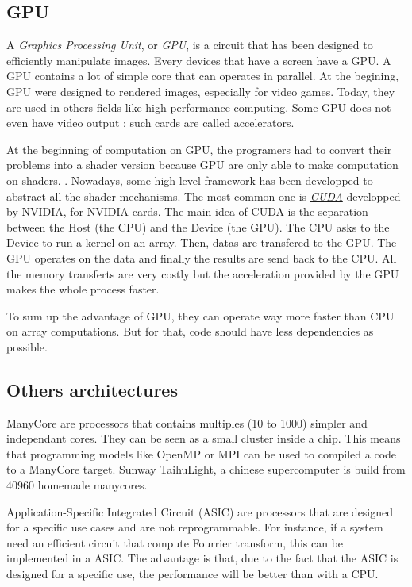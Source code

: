 \subsection{GPU}
A \emph{Graphics Processing Unit}, or \emph{GPU}, is a circuit that has been designed to efficiently manipulate images. Every devices that have a screen have a GPU. A GPU contains a lot of simple core that can operates in parallel. At the begining, GPU were designed to rendered images, especially for video games. Today, they are used in others fields like high performance computing. Some GPU does not even have video output : such cards are called accelerators.

At the beginning of computation on GPU, the programers had to convert their problems into a shader version because GPU are only able to make computation on shaders. . Nowadays, some high level framework has been developped to abstract all the shader mechanisms. The most common one is \href{https://developer.nvidia.com/cuda-zone}{\emph{CUDA}} developped by NVIDIA, for NVIDIA cards. The main idea of CUDA is the separation between the Host (the CPU) and the Device (the GPU). The CPU asks to the Device to run a kernel on an array. Then, datas are transfered to the GPU. The GPU operates on the data and finally the results are send back to the CPU. All the memory transferts are very costly but the acceleration provided by the GPU makes the whole process faster. 

To sum up the advantage of GPU, they can operate way more faster than CPU on array computations. But for that, code should have less dependencies as possible.

\subsection{Others architectures}
ManyCore are processors that contains multiples (10 to 1000) simpler and independant cores. They can be seen as a small cluster inside a chip. This means that programming models like OpenMP or MPI can be used to compiled a code to a ManyCore target. Sunway TaihuLight, a chinese supercomputer is build from 40960 homemade manycores.

Application-Specific Integrated Circuit (ASIC) are processors that are designed for a specific use cases and are not reprogrammable. For instance, if a system need an efficient circuit that compute Fourrier transform, this can be implemented in a ASIC. The advantage is that, due to the fact that the ASIC is designed for a specific use, the performance will be better than with a CPU.

